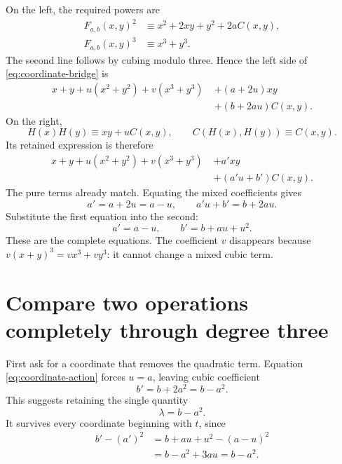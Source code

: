 On the left, the required powers are
\begin{align*}
 F_{a,b}(x,y)^2&\equiv x^2+2xy+y^2+2aC(x,y),\\
 F_{a,b}(x,y)^3&\equiv x^3+y^3.
\end{align*}
The second line follows by cubing modulo three. Hence the left side of \eqref{eq:coordinate-bridge} is
\begin{equation*}
 \begin{split}
 x+y+u(x^2+y^2)+v(x^3+y^3)\;&+(a+2u)xy\\
 &+(b+2au)C(x,y).
 \end{split}
\end{equation*}
On the right,
\[
 H(x)H(y)\equiv xy+uC(x,y),\qquad
 C(H(x),H(y))\equiv C(x,y).
\]
Its retained expression is therefore
\begin{equation*}
 \begin{split}
 x+y+u(x^2+y^2)+v(x^3+y^3)\;&+a'xy\\
 &+(a'u+b')C(x,y).
 \end{split}
\end{equation*}
The pure terms already match. Equating the mixed coefficients gives
\[
 a'=a+2u=a-u,\qquad a'u+b'=b+2au.
\]
Substitute the first equation into the second:
\begin{equation}\label{eq:coordinate-action}
 \boxed{\quad a'=a-u,\qquad b'=b+au+u^2.\quad}
\end{equation}
These are the complete equations. The coefficient \(v\) disappears because \(v(x+y)^3=vx^3+vy^3\): it cannot change a mixed cubic term.

\section{Compare two operations completely through degree three}\label{sec:classification}

First ask for a coordinate that removes the quadratic term. Equation \eqref{eq:coordinate-action} forces \(u=a\), leaving cubic coefficient
\[
 b'=b+2a^2=b-a^2.
\]
This suggests retaining the single quantity
\begin{equation}\label{eq:lambda}
 \lambda=b-a^2.
\end{equation}
It survives every coordinate beginning with \(t\), since
\begin{align*}
 b'-(a')^2
 &=b+au+u^2-(a-u)^2\\
 &=b-a^2+3au=b-a^2.
\end{align*}

